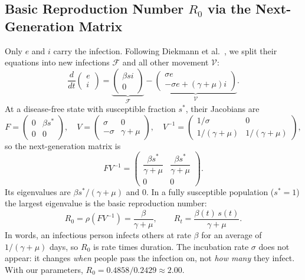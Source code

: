 \documentclass[11pt,a4paper]{article}
\begin{document}
\subsection{Basic Reproduction Number \texorpdfstring{$R_0$}{R0} via the Next-Generation Matrix}
Only $e$ and $i$ carry the infection. Following Diekmann et al.~\cite{diekmann2010construction}, we split their equations into new infections $\mathcal{F}$ and all other movement $\mathcal{V}$:
\begin{equation}
    \frac{d}{dt}\begin{pmatrix} e \\ i \end{pmatrix} =
    \underbrace{\begin{pmatrix} \beta s i \\ 0 \end{pmatrix}}_{\mathcal{F}} -
    \underbrace{\begin{pmatrix} \sigma e \\ -\sigma e + (\gamma + \mu) i \end{pmatrix}}_{\mathcal{V}}.
\end{equation}
At a disease-free state with susceptible fraction $s^*$, their Jacobians are
\begin{equation}
    F = \begin{pmatrix} 0 & \beta s^* \\ 0 & 0 \end{pmatrix}, \quad
    V = \begin{pmatrix} \sigma & 0 \\ -\sigma & \gamma + \mu \end{pmatrix}, \quad
    V^{-1} = \begin{pmatrix} 1/\sigma & 0 \\ 1/(\gamma + \mu) & 1/(\gamma + \mu) \end{pmatrix},
\end{equation}
so the next-generation matrix is
\begin{equation}
    F V^{-1} = \begin{pmatrix} \dfrac{\beta s^*}{\gamma + \mu} & \dfrac{\beta s^*}{\gamma + \mu} \\[2mm] 0 & 0 \end{pmatrix}.
\end{equation}
Its eigenvalues are $\beta s^*/(\gamma+\mu)$ and $0$. In a fully susceptible population ($s^* = 1$) the largest eigenvalue is the basic reproduction number:
\begin{equation}
    R_0 = \rho(F V^{-1}) = \frac{\beta}{\gamma + \mu},
    \qquad
    R_t = \frac{\beta(t) \, s(t)}{\gamma + \mu}.
    \label{eq:R0}
\end{equation}
In words, an infectious person infects others at rate $\beta$ for an average of $1/(\gamma+\mu)$ days, so $R_0$ is rate times duration. The incubation rate $\sigma$ does not appear: it changes \emph{when} people pass the infection on, not \emph{how many} they infect. With our parameters, $R_0 = 0.4858/0.2429 \approx 2.00$.
\end{document}
